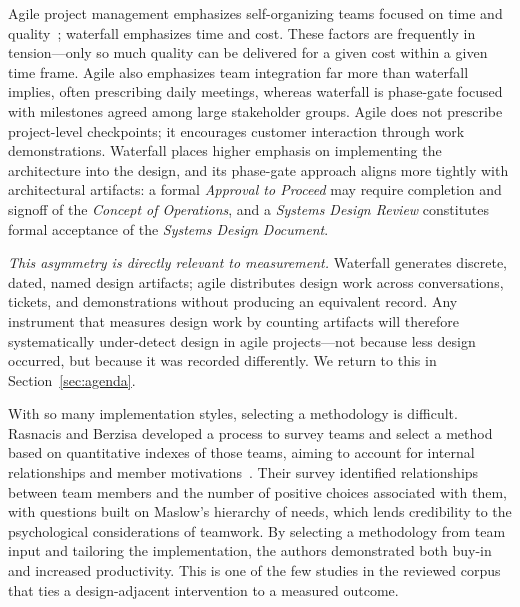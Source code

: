 \documentclass[11pt,a4paper]{article}
\begin{document}
Agile project management emphasizes self-organizing teams focused on time and
quality~\citep{sliger2011,rasnacis2017}; waterfall emphasizes time and cost.
These factors are frequently in tension---only so much quality can be delivered
for a given cost within a given time frame. Agile also emphasizes team
integration far more than waterfall implies, often prescribing daily meetings,
whereas waterfall is phase-gate focused with milestones agreed among large
stakeholder groups. Agile does not prescribe project-level checkpoints; it
encourages customer interaction through work demonstrations. Waterfall places
higher emphasis on implementing the architecture into the design, and its
phase-gate approach aligns more tightly with architectural artifacts: a formal
\emph{Approval to Proceed} may require completion and signoff of the
\emph{Concept of Operations}, and a \emph{Systems Design Review} constitutes
formal acceptance of the \emph{Systems Design Document}.

\emph{This asymmetry is directly relevant to measurement.} Waterfall generates
discrete, dated, named design artifacts; agile distributes design work across
conversations, tickets, and demonstrations without producing an equivalent
record. Any instrument that measures design work by counting artifacts will
therefore systematically under-detect design in agile projects---not because
less design occurred, but because it was recorded differently. We return to this
in Section~\ref{sec:agenda}.

With so many implementation styles, selecting a methodology is
difficult. Rasnacis and Berzisa developed a process to survey teams and select a
method based on quantitative indexes of those teams, aiming to account for
internal relationships and member motivations~\citep{rasnacis2017}. Their survey
identified relationships between team members and the number of positive choices
associated with them, with questions built on Maslow's hierarchy of needs, which
lends credibility to the psychological considerations of teamwork. By selecting
a methodology from team input and tailoring the implementation, the authors
demonstrated both buy-in and increased productivity. This is one of the few
studies in the reviewed corpus that ties a design-adjacent intervention to a
measured outcome.
\end{document}

